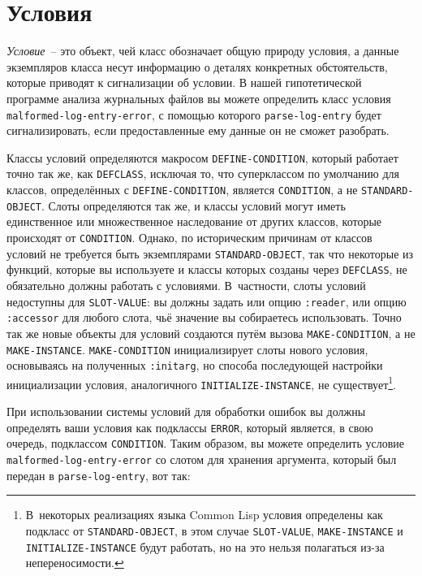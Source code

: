 \section{Условия}

\textit{Условие}~-- это объект, чей класс обозначает общую природу условия, а данные
экземпляров класса несут информацию о деталях конкретных обстоятельств, которые приводят к
сигнализации об условии. В
нашей гипотетической программе анализа журнальных файлов вы можете определить класс
условия \lstinline{malformed-log-entry-error}, с помощью которого \lstinline{parse-log-entry} будет
сигнализировать, если предоставленные ему данные он не сможет разобрать.

Классы условий определяются макросом \lstinline{DEFINE-CONDITION}, который работает точно так
же, как \lstinline{DEFCLASS}, исключая то, что суперклассом по умолчанию для классов,
определённых с \lstinline{DEFINE-CONDITION}, является \lstinline{CONDITION}, а не
\lstinline{STANDARD-OBJECT}. Слоты определяются так же, и классы условий могут иметь
единственное или множественное наследование от других классов, которые происходят от
\lstinline{CONDITION}. Однако, по историческим причинам от классов условий не требуется быть
экземплярами \lstinline{STANDARD-OBJECT}, так что некоторые из функций, которые вы используете
и классы которых созданы через \lstinline{DEFCLASS}, не обязательно должны работать с
условиями. В~частности, слоты условий недоступны для \lstinline{SLOT-VALUE}: вы должны задать
или опцию \lstinline{:reader}, или опцию \lstinline{:accessor} для любого слота, чьё значение вы
собираетесь использовать. Точно так же новые объекты для условий создаются путём вызова
\lstinline{MAKE-CONDITION}, а не \lstinline{MAKE-INSTANCE}. \lstinline{MAKE-CONDITION} инициализирует
слоты нового условия, основываясь на полученных \lstinline{:initarg}, но способа последующей
настройки инициализации условия, аналогичного \lstinline{INITIALIZE-INSTANCE}, не
существует\footnote{В~некоторых реализациях языка Common Lisp условия определены как
  подкласс от \lstinline{STANDARD-OBJECT}, в этом случае \lstinline{SLOT-VALUE},
  \lstinline{MAKE-INSTANCE} и \lstinline{INITIALIZE-INSTANCE} будут работать, но на это нельзя
  полагаться из-за непереносимости.}\hspace{\footnotenegspace}.

При использовании системы условий для обработки ошибок вы должны определять ваши условия
как подклассы \lstinline{ERROR}, который является, в свою очередь, подклассом
\lstinline{CONDITION}. Таким образом, вы можете определить условие
\lstinline{malformed-log-entry-error} со слотом для хранения аргумента, который был передан в
\lstinline{parse-log-entry}, вот так:

